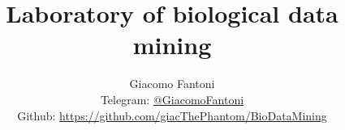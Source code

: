 

\title{\Huge \textbf{Laboratory of biological data mining}}

\author{
  Giacomo Fantoni \\
  \small Telegram: \href{https://t.me/GiacomoFantoni}{@GiacomoFantoni} \\[3pt]
  \small Github: \href{https://github.com/giacThePhantom/DataMining}{https://github.com/giacThePhantom/BioDataMining}}

\maketitle
\tableofcontents



